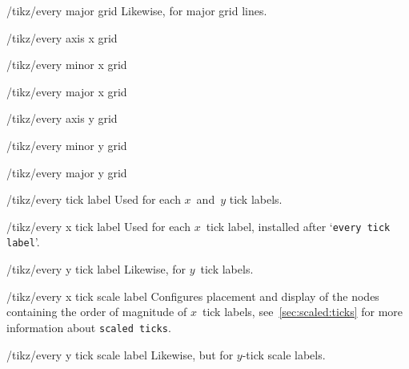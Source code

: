 \begin{stylekey}{/tikz/every major grid}
 Likewise, for major grid lines.
\end{stylekey}

\begin{stylekey}{/tikz/every axis x grid}

\end{stylekey}

\begin{stylekey}{/tikz/every minor x grid}

\end{stylekey}

\begin{stylekey}{/tikz/every major x grid}

\end{stylekey}

\begin{stylekey}{/tikz/every axis y grid}

\end{stylekey}

\begin{stylekey}{/tikz/every minor y grid}

\end{stylekey}

\begin{stylekey}{/tikz/every major y grid}

\end{stylekey}

\begin{stylekey}{/tikz/every tick label}
 Used for each $x$~and~$y$ tick labels.
\end{stylekey}

\begin{stylekey}{/tikz/every x tick label}
 Used for each $x$~tick label, installed after `\texttt{every tick label}'.
\end{stylekey}

\begin{stylekey}{/tikz/every y tick label}
 Likewise, for $y$~tick labels.
\end{stylekey}

\begin{stylekey}{/tikz/every x tick scale label}
 Configures placement and display of the nodes containing the order of magnitude of $x$~tick labels, see~\ref{sec:scaled:ticks} for more information about \texttt{scaled ticks}.
\end{stylekey}

\begin{stylekey}{/tikz/every y tick scale label}
 Likewise, but for $y$-tick scale labels.
\end{stylekey}

